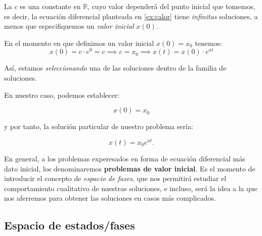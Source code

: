 La $c$ es una constante en $\mathbb{R}$, cuyo valor dependerá del punto inicial que tomemos, es decir, la ecuación diferencial planteada en \ref{ex:calor} tiene \emph{infinitas} soluciones, a menos que especifiquemos un \emph{valor inicial} $x(0)$.

En el momento en que definimos un valor inicial $x(0)=x_0$ tenemos:
\[x(0)=c\cdot e^0=c \implies c=x_0 \implies x(t) = x(0)\cdot e^{at}\]

Así, estamos \emph{seleccionando} una de las soluciones dentro de la familia de soluciones.


\begin{center}
\end{center}

En nuestro caso, podemos establecer:

\begin{equation}
x(0) = x_0
\end{equation}

y por tanto, la solución particular de nuestro problema sería:

\begin{equation}
x(t) = x_0e^{at}.
\end{equation}

En general, a los problemas experesados en forma de ecuación diferencial más dato inicial, los denominaremos \textbf{problemas de valor inicial}.\newline
Es el momento de introducir el concepto de \emph{espacio de fases}, que nos permitirá estudiar el comportamiento cualitativo de nuestras soluciones, e incluso, será la idea a la que nos aferremos para obtener las soluciones en casos más complicados.

\subsection{Espacio de estados/fases}

